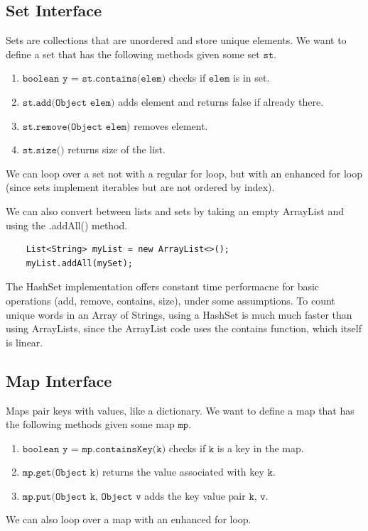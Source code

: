 \documentclass{article}
\begin{document}
  \subsection{Set Interface}

    Sets are collections that are unordered and store unique elements. We want to define a set that has the following methods given some set $\texttt{st}$. 
    \begin{enumerate}
        \item $\texttt{boolean y = st.contains(elem)}$ checks if $\texttt{elem}$ is in set. 
        \item $\texttt{st.add(Object elem)}$ adds element and returns false if already there. 
        \item $\texttt{st.remove(Object elem)}$ removes element. 
        \item $\texttt{st.size()}$ returns size of the list. 
    \end{enumerate}
    We can loop over a set not with a regular for loop, but with an enhanced for loop (since sets implement iterables but are not ordered by index). 

    \begin{theorem}
    We can also convert between lists and sets by taking an empty ArrayList and using the .addAll() method.
    \begin{lstlisting}
    List<String> myList = new ArrayList<>(); 
    myList.addAll(mySet); 
    \end{lstlisting}
    \end{theorem}

    \begin{definition}[HashSet]
    The HashSet implementation offers constant time performacne for basic operations (add, remove, contains, size), under some assumptions. To count unique words in an Array of Strings, using a HashSet is much much faster than using ArrayLists, since the ArrayList code uses the contains function, which itself is linear. 
    \end{definition}

  \subsection{Map Interface}

    Maps pair keys with values, like a dictionary. We want to define a map that has the following methods given some map $\texttt{mp}$. 
    \begin{enumerate}
        \item $\texttt{boolean y = mp.containsKey(k)}$ checks if $\texttt{k}$ is a key in the map. 
        \item $\texttt{mp.get(Object k)}$ returns the value associated with key $\texttt{k}$. 
        \item $\texttt{mp.put(Object k, Object v}$ adds the key value pair $\texttt{k}$, $\texttt{v}$. 
    \end{enumerate}
    We can also loop over a map with an enhanced for loop. 
\end{document}
